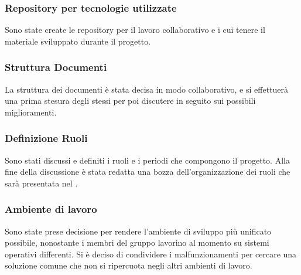 \subsubsection{Repository per tecnologie utilizzate}
Sono state create le repository per il lavoro collaborativo e i cui tenere il materiale sviluppato durante il progetto.

\subsubsection{Struttura Documenti}
La struttura dei documenti è stata decisa in modo collaborativo, e si effettuerà una prima stesura degli stessi per poi discutere in seguito sui possibili miglioramenti.

\subsubsection{Definizione Ruoli}
Sono stati discussi e definiti i ruoli e i periodi che compongono il progetto.
Alla fine della discussione è stata redatta una bozza dell'organizzazione dei ruoli che sarà presentata nel \PianoDiProgetto{}.

\subsubsection{Ambiente di lavoro}
Sono state prese decisione per rendere l'ambiente di sviluppo più unificato possibile, nonostante i membri del gruppo lavorino al momento su sistemi operativi differenti.
Si è deciso di condividere i malfunzionamenti per cercare una soluzione comune che non si ripercuota negli altri ambienti di lavoro.

\clearpage
